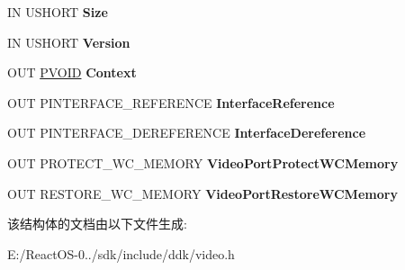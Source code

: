 \begin{DoxyCompactItemize}
\item 
\mbox{\label{struct___v_i_d_e_o___p_o_r_t___w_c_m_e_m_o_r_y_p_r_o_t_e_c_t_i_o_n___i_n_t_e_r_f_a_c_e_a2ffff508af7a231b96062c2bf15c96ba}} 
IN U\+S\+H\+O\+RT {\bfseries Size}
\item 
\mbox{\label{struct___v_i_d_e_o___p_o_r_t___w_c_m_e_m_o_r_y_p_r_o_t_e_c_t_i_o_n___i_n_t_e_r_f_a_c_e_a5825a4cd5c43caf6828c0d2ce8981420}} 
IN U\+S\+H\+O\+RT {\bfseries Version}
\item 
\mbox{\label{struct___v_i_d_e_o___p_o_r_t___w_c_m_e_m_o_r_y_p_r_o_t_e_c_t_i_o_n___i_n_t_e_r_f_a_c_e_a17610ccc72355879e9a06e33b6054062}} 
O\+UT \hyperlink{interfacevoid}{P\+V\+O\+ID} {\bfseries Context}
\item 
\mbox{\label{struct___v_i_d_e_o___p_o_r_t___w_c_m_e_m_o_r_y_p_r_o_t_e_c_t_i_o_n___i_n_t_e_r_f_a_c_e_ad3c13c252ae4dd717da0a8ea67b3e200}} 
O\+UT P\+I\+N\+T\+E\+R\+F\+A\+C\+E\+\_\+\+R\+E\+F\+E\+R\+E\+N\+CE {\bfseries Interface\+Reference}
\item 
\mbox{\label{struct___v_i_d_e_o___p_o_r_t___w_c_m_e_m_o_r_y_p_r_o_t_e_c_t_i_o_n___i_n_t_e_r_f_a_c_e_a1ca67e427b2c5f9d09b5064ff64c67ba}} 
O\+UT P\+I\+N\+T\+E\+R\+F\+A\+C\+E\+\_\+\+D\+E\+R\+E\+F\+E\+R\+E\+N\+CE {\bfseries Interface\+Dereference}
\item 
\mbox{\label{struct___v_i_d_e_o___p_o_r_t___w_c_m_e_m_o_r_y_p_r_o_t_e_c_t_i_o_n___i_n_t_e_r_f_a_c_e_ae9647943a83c3ede16b175a613868afd}} 
O\+UT P\+R\+O\+T\+E\+C\+T\+\_\+\+W\+C\+\_\+\+M\+E\+M\+O\+RY {\bfseries Video\+Port\+Protect\+W\+C\+Memory}
\item 
\mbox{\label{struct___v_i_d_e_o___p_o_r_t___w_c_m_e_m_o_r_y_p_r_o_t_e_c_t_i_o_n___i_n_t_e_r_f_a_c_e_a3349c382e897382d4a986533cc25682b}} 
O\+UT R\+E\+S\+T\+O\+R\+E\+\_\+\+W\+C\+\_\+\+M\+E\+M\+O\+RY {\bfseries Video\+Port\+Restore\+W\+C\+Memory}
\end{DoxyCompactItemize}


该结构体的文档由以下文件生成\+:\begin{DoxyCompactItemize}
\item 
E\+:/\+React\+O\+S-\/0../sdk/include/ddk/video.\+h\end{DoxyCompactItemize}
